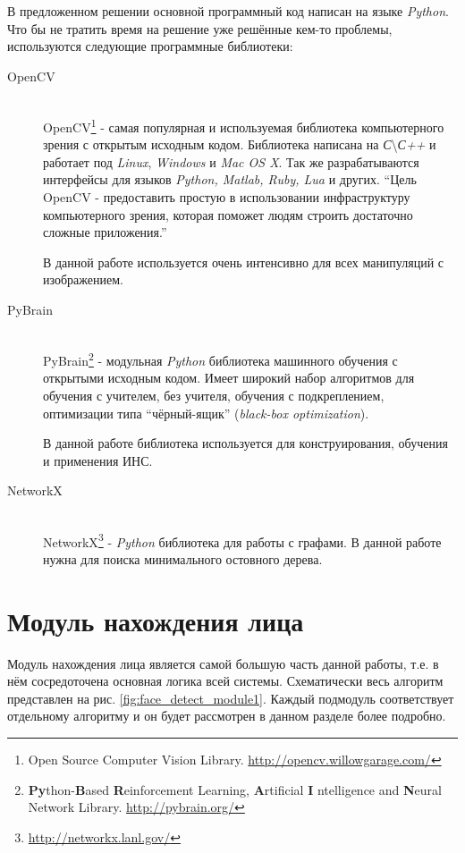\documentclass[12pt]{report}
\begin{document}
В предложенном решении основной программный код написан на языке \textit{Python}. Что бы не тратить время на 
решение 
уже решённые кем-то проблемы, используются следующие программные библиотеки:
\begin{description}

\item[OpenCV]\hfill \\
	OpenCV\footnote{Open Source Computer Vision Library. \url{http://opencv.willowgarage.com/}} - самая популярная 
и 
используемая библиотека компьютерного зрения с открытым исходным кодом. Библиотека написана на \textit{С}\textbackslash{}\textit{С++} и работает под \textit{Linux}, \textit{Windows} и \textit{Mac OS X}. Так же разрабатываются интерфейсы 
для языков \textit{Python, Matlab, Ruby, Lua} и других. ``Цель OpenCV - предоставить простую в использовании 
инфраструктуру компьютерного зрения, которая поможет людям строить достаточно сложные приложения.'' \citep
{bradski2008learning}
	
В данной работе используется очень интенсивно для всех манипуляций с изображением.

\item[PyBrain]\hfill \\
	PyBrain\footnote{\textbf{Py}thon-\textbf{B}ased \textbf{R}einforcement Learning, \textbf{A}rtificial \textbf{I}
ntelligence and \textbf{N}eural Network Library. \url{http://pybrain.org/}} - модульная \textit{Python} библиотека 
машинного обучения с открытыми исходным кодом. Имеет широкий набор алгоритмов для обучения с учителем, без учителя, 
обучения с подкреплением, оптимизации типа ``чёрный-ящик'' (\textit{black-box optimization}).
	
В данной работе библиотека используется для конструирования, обучения и применения ИНС.

\item[NetworkX]\hfill \\
NetworkX\footnote{\url{http://networkx.lanl.gov/}} - \textit{Python} библиотека для работы с графами. В данной 
работе 
нужна для поиска минимального остовного дерева.

\end{description}

\section{Модуль нахождения лица}

Модуль нахождения лица является самой большую часть данной работы, т.е. в нём сосредоточена основная логика всей 
системы. Схематически весь алгоритм представлен на рис. \ref{fig:face_detect_module1}. Каждый подмодуль 
соответствует 
отдельному алгоритму и он будет рассмотрен в данном разделе более подробно. %
\end{document}
